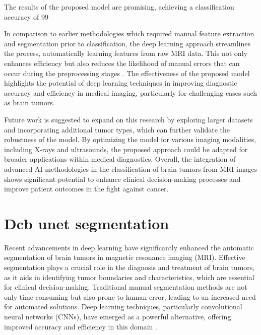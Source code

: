 \documentclass[runningheads]{llncs}
\begin{document}
The results of the proposed model are promising, achieving a classification accuracy of 99%

In comparison to earlier methodologies which required manual feature extraction and segmentation prior to classification, the deep learning approach streamlines the process, automatically learning features from raw MRI data. This not only enhances efficiency but also reduces the likelihood of manual errors that can occur during the preprocessing stages \cite{Sarah_2020}. The effectiveness of the proposed model highlights the potential of deep learning techniques in improving diagnostic accuracy and efficiency in medical imaging, particularly for challenging cases such as brain tumors.

Future work is suggested to expand on this research by exploring larger datasets and incorporating additional tumor types, which can further validate the robustness of the model. By optimizing the model for various imaging modalities, including X-rays and ultrasounds, the proposed approach could be adapted for broader applications within medical diagnostics. Overall, the integration of advanced AI methodologies in the classification of brain tumors from MRI images shows significant potential to enhance clinical decision-making processes and improve patient outcomes in the fight against cancer.
\section{Dcb unet segmentation}
Recent advancements in deep learning have significantly enhanced the automatic segmentation of brain tumors in magnetic resonance imaging (MRI). Effective segmentation plays a crucial role in the diagnosis and treatment of brain tumors, as it aids in identifying tumor boundaries and characteristics, which are essential for clinical decision-making. Traditional manual segmentation methods are not only time-consuming but also prone to human error, leading to an increased need for automated solutions. Deep learning techniques, particularly convolutional neural networks (CNNs), have emerged as a powerful alternative, offering improved accuracy and efficiency in this domain \cite{Akter_2024, Ullah_2023, Zhao_2024}.
\end{document}
